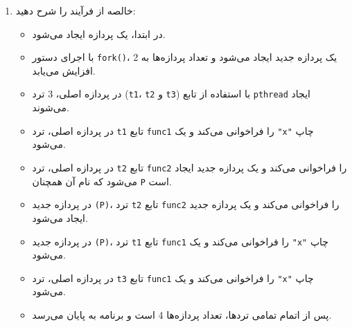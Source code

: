 \begin{qsolve}
\begin{enumerate}
\begin{latin}
\end{latin}
		
		
		
		
		\item ‫خالصه‬ ‫از‬ ‫فرآیند‬ ‫را‬ ‫شرح‬ ‫دهید‬:
		\begin{itemize}
			\item در ابتدا، یک پردازه ایجاد می‌شود.
			\item با اجرای دستور \texttt{fork()}، یک پردازه جدید ایجاد می‌شود و تعداد پردازه‌ها به 2 افزایش می‌یابد.
			\item در پردازه اصلی، 3 ترد (\texttt{t1}، \texttt{t2} و \texttt{t3}) با استفاده از تابع \texttt{pthread} ایجاد می‌شوند.
			\item در پردازه اصلی، ترد \texttt{t1} تابع \texttt{func1} را فراخوانی می‌کند و یک \texttt{"x"} چاپ می‌شود.
			\item در پردازه اصلی، ترد \texttt{t2} تابع \texttt{func2} را فراخوانی می‌کند و یک پردازه جدید ایجاد می‌شود که نام آن همچنان \texttt{P} است.
			\item در پردازه جدید \texttt{(P)}، ترد \texttt{t2} تابع \texttt{func2} را فراخوانی می‌کند و یک پردازه جدید ایجاد می‌شود.
			\item در پردازه جدید \texttt{(P)}، ترد \texttt{t1} تابع \texttt{func1} را فراخوانی می‌کند و یک \texttt{"x"} چاپ می‌شود.
			\item در پردازه اصلی، ترد \texttt{t3} تابع \texttt{func1} را فراخوانی می‌کند و یک \texttt{"x"} چاپ می‌شود.
			\item پس از اتمام تمامی تردها، تعداد پردازه‌ها 4 است و برنامه به پایان می‌رسد.
			
			
		\end{itemize}
		
		
		
		
	\end{enumerate}
\end{qsolve}